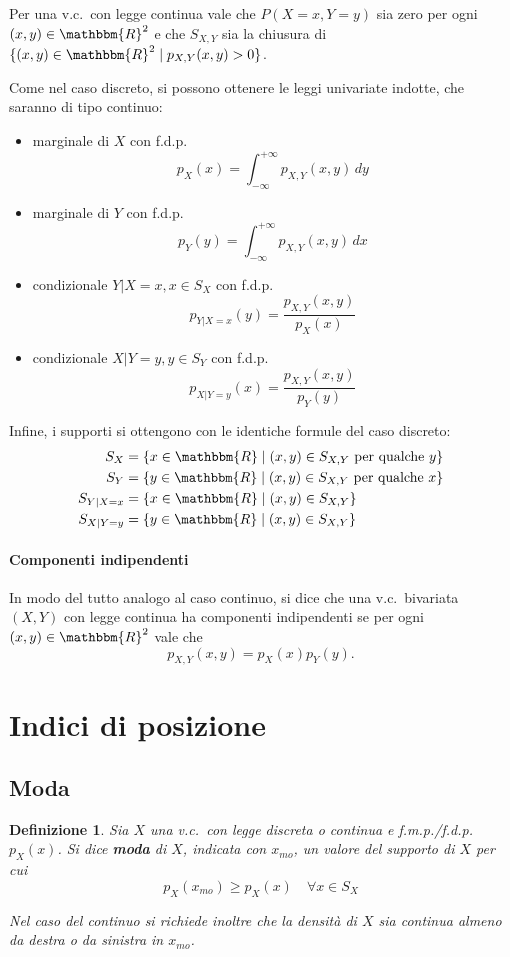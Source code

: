 \documentclass[11pt,a4paper,twoside]{article}
\newtheorem{definition}{Definizione}
\let\geq\geqslant%
\newcommand\R{\mathbbm{R}}
\newcommand\dx{\,dx}
\newcommand\dy{\,dy}
\begin{document}
Per una v.c.\ con legge continua vale che \(P(X=x, Y=y)\) sia zero
per ogni \((x,y)\in\R^2\) e che \(S_{X,Y}\) sia la chiusura
di \(\{ (x,y)\in\R^2 \mid p_{X,Y} (x,y) > 0 \}\).

Come nel caso discreto, si possono ottenere le leggi univariate
indotte, che saranno di tipo continuo:
\begin{itemize}
\item marginale di \(X\) con f.d.p.
  \[ p_X(x) = \int_{-\infty}^{+\infty}p_{X,Y}(x,y)\dy \]
\item marginale di \(Y\) con f.d.p.
  \[ p_Y(y) = \int_{-\infty}^{+\infty}p_{X,Y}(x,y)\dx \]
\item condizionale \(Y|X=x, x\in S_X\) con f.d.p.
  \[ p_{Y|X=x}(y) = \frac{p_{X,Y}(x,y)}{p_X(x)} \]
\item condizionale \(X|Y=y, y\in S_Y\) con f.d.p.
  \[ p_{X|Y=y}(x) = \frac{p_{X,Y}(x,y)}{p_Y(y)} \]
\end{itemize}

Infine, i supporti si ottengono con le identiche formule del caso
discreto:
\begin{align*}
  S_X      &= \{ x\in\R\mid (x,y)\in S_{X,Y} \mbox{ per qualche } y \} \\
  S_Y      &= \{ y\in\R\mid (x,y)\in S_{X,Y} \mbox{ per qualche } x \} \\
  S_{Y|X=x} &= \{ x\in\R\mid (x,y)\in S_{X,Y} \} \\
  S_{X|Y=y} &= \{ y\in\R\mid (x,y)\in S_{X,Y} \} \\
\end{align*}

\paragraph{Componenti indipendenti}
In modo del tutto analogo al caso continuo, si dice che una v.c.\
bivariata \((X,Y)\) con legge continua ha componenti indipendenti se
per ogni \((x,y)\in\R^2\) vale che
\[ p_{X,Y}(x,y) = p_X(x) p_Y(y). \]

\section{Indici di posizione}

\subsection{Moda}
\begin{definition}
  Sia \(X\) una v.c.\ con legge discreta o continua e f.m.p./f.d.p.\
  \(p_X(x)\).  Si dice \textbf{moda} di \(X\), indicata con
  \(x_{mo}\), un valore del supporto di \(X\) per cui
  \[
    p_X(x_{mo}) \geq p_X(x) \quad \forall x\in S_X
  \]
  
  Nel caso del continuo si richiede inoltre che la densità di \(X\)
  sia continua almeno da destra o da sinistra in \(x_{mo}\).
\end{definition}
\end{document}
